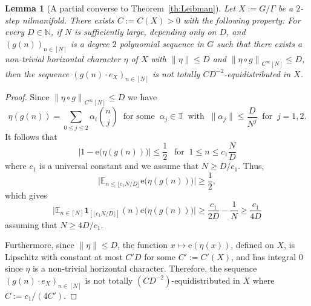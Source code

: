 \documentclass[11pt]{amsart}
\newtheorem{lemma}{Lemma}[section]
\theoremstyle{definition}
\begin{document}
\begin{lemma}[A partial  converse to  Theorem~\ref{th:Leibman}]
\label{lem:Leibman_Inverse} Let $X:=G/\Gamma$ be a $2$-step
nilmanifold. There exists $C:=C(X)>0$ with the following property:
For every $D\in {{\mathbb N}}$, if $N$ is sufficiently large, depending only on  $D$, and
$(g(n))_{n\in[N]}$ is a degree $2$ polynomial sequence in $G$  such
that there exists a non-trivial horizontal character $\eta$ of $X$
with ${\lVert \eta \rVert}\leq D$ and ${\lVert {\eta\circ g} \rVert}_{C^\infty[N]}\leq D$,
then the sequence $(g(n)\cdot e_X)_{n\in[N]}$ is not totally
$CD^{-2}$-equidistributed in $X$.
\end{lemma}
\begin{proof}
Since ${\lVert {\eta\circ g} \rVert}_{C^\infty[N]}\leq D$ we have
$$
\eta(g(n))=\sum_{0\leq j\leq 2}\alpha_i\binom nj \ \text{ for some }
\ \alpha_j\in{{\mathbb T}}\ \text{ with } \ {\lVert {\alpha_j} \rVert}\leq \frac{D}{N^j}\
\text{ for } \ j=1,2.
$$
It follows  that
$$
\bigl|1-{\mathrm{e}}\big(\eta(g(n))\big)\bigr|\leq \frac{1}{2}\ \ \text{ for }\
1\leq n\leq c_1\frac{N}{D}
$$
where $c_1$ is a universal constant and we assume that $N\geq D/c_1$. Thus,
$$
\bigl|{{\mathbb E}}_{n\leq \lfloor c_1N/D\rfloor }{\mathrm{e}}\big(\eta(g(n))\big)\bigr|\geq
\frac{1}{2},
$$
which gives
$$
\bigl|{{\mathbb E}}_{n\in [N] }{\mathbf{1}}_{[\lfloor c_1N/D\rfloor]}(n) {\mathrm{e}}\big(\eta(g(n))\big)\bigr|\geq
\frac{c_1}{2D}-\frac{1}{N}\geq \frac{c_1}{4D}
$$
assuming that $N\geq 4D/c_1$.

Furthermore, since ${\lVert \eta \rVert}\leq D$,  the function $x\mapsto
{\mathrm{e}}(\eta(x))$, defined on $X$, is Lipschitz with constant at most
$C'D$ for some $C':=C'(X)$, and    has integral $0$ since $\eta$ is
a non-trivial horizontal character. Therefore,  the sequence
$(g(n)\cdot e_X)_{n\in[N]}$ is not totally $(CD^{-2})
$-equidistributed in $X$ where  $C:= c_1/(4C')$.
\end{proof}
\end{document}
